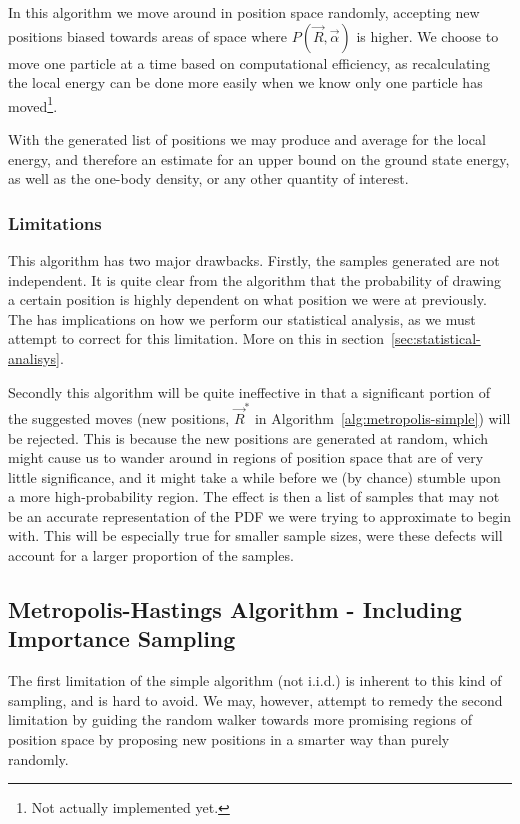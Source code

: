 \documentclass[twocolumn]{article}
\begin{document}
In this algorithm we move around in position space randomly, accepting new
positions biased towards areas of space where $P(\vec R,\vec\alpha)$ is higher.
We choose to move one particle at a time based on computational efficiency, as
recalculating the local energy can be done more easily when we know only one
particle has moved\footnote{Not actually implemented yet.}.

With the generated list of positions we may produce and average for the local
energy, and therefore an estimate for an upper bound on the ground state energy,
as well as the one-body density, or any other quantity of interest.

\subsubsection{Limitations}
This algorithm has two major drawbacks. Firstly, the samples generated are not
independent. It is quite clear from the algorithm that the probability of
drawing a certain position is highly dependent on what position we were at
previously. The has implications on how we perform our statistical analysis, as
we must attempt to correct for this limitation. More on this in
section~\ref{sec:statistical-analisys}.

Secondly this algorithm will be quite ineffective in that a significant portion
of the suggested moves (new positions, $\vec R^*$ in
Algorithm~\ref{alg:metropolis-simple}) will be rejected. This is because the new
positions are generated at random, which might cause us to wander around in
regions of position space that are of very little significance, and it might
take a while before we (by chance) stumble upon a more high-probability region.
The effect is then a list of samples that may not be an accurate representation
of the PDF we were trying to approximate to begin with. This will be especially
true for smaller sample sizes, were these defects will account for a larger
proportion of the samples.


\subsection{Metropolis-Hastings Algorithm - Including Importance Sampling}
The first limitation of the simple algorithm (not i.i.d.) is inherent to this
kind of sampling, and is hard to avoid. We may, however, attempt to remedy the
second limitation by guiding the random walker towards more promising regions of
position space by proposing new positions in a smarter way than purely randomly.
\end{document}
